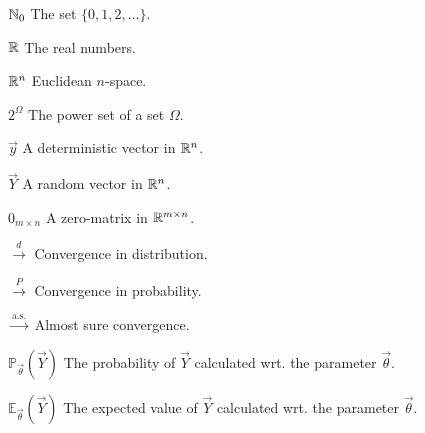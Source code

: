 \begin{listofnotation}
\item[$\mathbb{N}_{0}$] The set $\{0,1,2,\dots\}$.
\item[$\mathbb{R}$] The real numbers.
\item[$\mathbb{R}^{n}$] Euclidean $n$-space.
\item[$2^{\Omega}$] The power set of a set $\Omega$.
\item[$\Vec{y}$] A deterministic vector in $\mathbb{R}^{n}$.
\item[$\vec{Y}$] A random vector in $\mathbb{R}^n$.
\item[$0_{m\times n}$] A zero-matrix in $\mathbb{R}^{m\times n}$.
\item[$\overset{d}{\rightarrow}$] Convergence in distribution. 
\item[$\overset{P}{\rightarrow}$] Convergence in probability.
\item[$\xrightarrow{\mathrm{a.s.}}$] Almost sure convergence. 
\item[$\mathbb{P}_{\vec{\theta}}(\vec{Y})$] The probability of $\vec{Y}$ calculated wrt. the parameter $\vec{\theta}$.
\item[$\mathbb{E}_{\vec{\theta}}(\vec{Y})$] The expected value of $\vec{Y}$ calculated wrt. the parameter $\vec{\theta}$.




\end{listofnotation}

